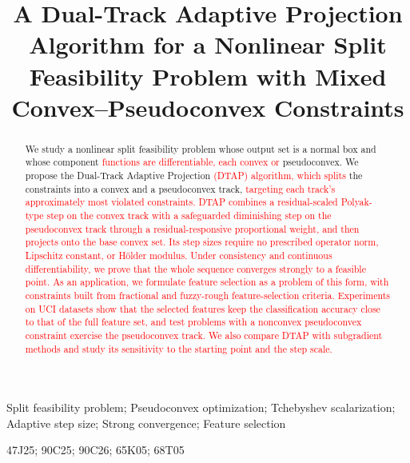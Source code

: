\documentclass[]{interact}
\theoremstyle{plain}
\theoremstyle{definition}
\theoremstyle{remark}
\begin{document}
\title{A Dual-Track Adaptive Projection Algorithm for a Nonlinear Split Feasibility Problem with Mixed Convex--Pseudoconvex Constraints}

\author{
}

\maketitle

\begin{abstract}
We study a nonlinear split feasibility problem whose output set is a normal box and whose component \leavevmode\textcolor{red}{functions are differentiable, each convex or} pseudoconvex. We propose the Dual-Track Adaptive Projection \leavevmode\textcolor{red}{(DTAP) algorithm, which splits} the constraints into a convex and a pseudoconvex track, \leavevmode\textcolor{red}{targeting each track's approximately most violated constraints. DTAP combines a residual-scaled Polyak-type step on the convex track with a safeguarded diminishing step on the pseudoconvex track through a residual-responsive proportional weight, and then projects onto the base convex set. Its step sizes require no prescribed operator norm, Lipschitz constant, or H\"older modulus. Under consistency and continuous differentiability, we prove that the whole sequence converges strongly to a feasible point. As an application, we formulate feature selection as a problem of this form, with constraints built from fractional and fuzzy-rough feature-selection criteria. Experiments on UCI datasets show that the selected features keep the classification accuracy close to that of the full feature set, and test problems with a nonconvex pseudoconvex constraint exercise the pseudoconvex track. We also compare DTAP with subgradient methods and study its sensitivity to the starting point and the step scale.}
\end{abstract}

\begin{keywords}
Split feasibility problem; Pseudoconvex optimization; Tchebyshev scalarization; Adaptive step size; Strong convergence; Feature selection
\end{keywords}
\begin{amscode}
47J25; 90C25; 90C26; 65K05; 68T05
\end{amscode}
\end{document}

